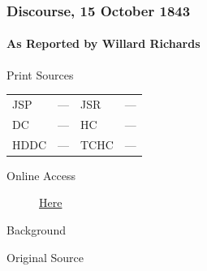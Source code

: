 		\subsubsection{Discourse, 15 October 1843}
			\label{EMS-1843-JS-15-OCT-1843}
			
			\paragraph{As Reported by Willard Richards}
				\label{EMS-1843-JS-15-OCT-1843-WR}
			
				\begin{description}
					\item[Print Sources]
				\end{description}

					\begin{tabular}{p{0.5in}p{1in}p{0.5in}p{1in}}
					JSP	 	& ---		& JSR 		& --- \\
					DC	 	& ---		& HC 		& --- \\
					HDDC 	& ---		& TCHC 		& --- \\
					\end{tabular}
				
				\begin{description}
					\item[Online Access] \href{https://www.josephsmithpapers.org/paper-summary/discourse-15-october-1843-as-reported-by-willard-richards/1}{Here}
				\end{description}
				
				\begin{description}
					\item[Background]
				\end{description}
				
				
				\begin{description}
					\item[Original Source]
				\end{description}
				
